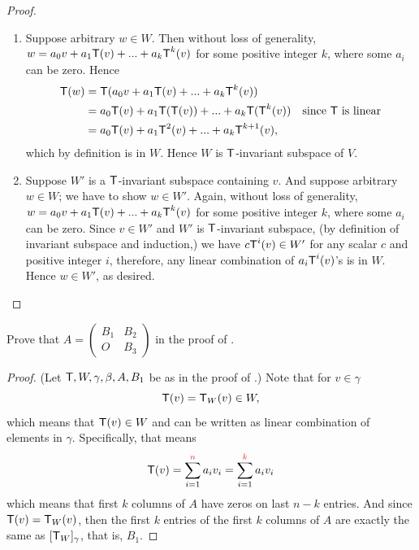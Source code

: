 \begin{proof} \ 

\begin{enumerate}
\item Suppose arbitrary \(w \in W\).
Then without loss of generality, \(w = a_0 v + a_1 \textsf{T}(v) + ... + a_k \textsf{T}^k(v)\) for some positive integer \(k\), where some \(a_i\) can be zero.
Hence
\begin{align*}
    \textsf{T}(w) & = \textsf{T}(a_0 v + a_1 \textsf{T}(v) + ... + a_k \textsf{T}^k(v)) \\
          & = a_0 \textsf{T}(v) + a_1 \textsf{T}(\textsf{T}(v)) + ... + a_k \textsf{T}(\textsf{T}^k(v)) & \text{since \(\textsf{T}\) is linear} \\
          & = a_0 \textsf{T}(v) + a_1 \textsf{T}^2(v) + ... + a_k \textsf{T}^{k + 1}(v),
\end{align*}
which by definition is in \(W\).
Hence \(W\) is \(\textsf{T}\)-invariant subspace of \(V\).

\item Suppose \(W'\) is a \(\textsf{T}\)-invariant subspace containing \(v\).
And suppose arbitrary \(w \in W\); we have to show \(w \in W'\).
Again, without loss of generality, \(w = a_0 v + a_1 \textsf{T}(v) + ... + a_k \textsf{T}^k(v)\) for some positive integer \(k\), where some \(a_i\) can be zero.
Since \(v \in W'\) and \(W'\) is \(\textsf{T}\)-invariant subspace, (by definition of invariant subspace and induction,) we have \(c \textsf{T}^i(v) \in W'\) for any scalar \(c\) and positive integer \(i\), therefore, any linear combination of \(a_i \textsf{T}^i(v)\)'s is in \(W\).
Hence \(w \in W'\), as desired.
\end{enumerate}
\end{proof}

\begin{exercise} \label{exercise 5.4.12}
Prove that \(A = \begin{pmatrix} B_1 & B_2 \\ O & B_3 \end{pmatrix}\) in the proof of .
\end{exercise}

\begin{proof}
(Let \(\textsf{T}, W, \gamma, \beta, A, B_1\) be as in the proof of .)
Note that for \(v \in \gamma\)
\[
    \textsf{T}(v) = \textsf{T}_W(v) \in W,
\]
which means that \(\textsf{T}(v) \in W\) and can be written as linear combination of elements in \(\gamma\).
Specifically, that means
\[
    \T(v) = \sum_{i = 1}^{\RED{n}} a_i v_i = \sum_{i=1}^{\RED{k}} a_i v_i
\]
which means that first \(k\) columns of \(A\) have zeros on last \(n - k\) entries.
And since \(\textsf{T}(v) = \textsf{T}_W(v)\), then the first \(k\) entries of the first \(k\) columns of \(A\) are exactly the same as \([\textsf{T}_W]_{\gamma}\), that is, \(B_1\).
\end{proof}


